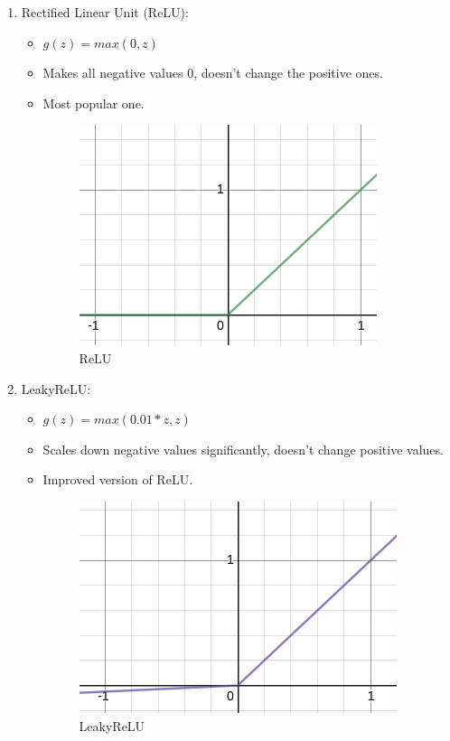 \documentclass{article}
\begin{document}
\begin{enumerate}
\begin{itemize}
		\end{itemize}\pagebreak
		\item Rectified Linear Unit (ReLU):\begin{itemize}
			\item \Large$g(z) = max(0,z)$\large
			\item Makes all negative values 0, doesn't change the positive ones.
			\item Most popular one.
			\begin{figure}[h]
				\centering
				\includegraphics[scale=0.5]{im/relu.png}
				\caption{ReLU}
			\end{figure}
		\end{itemize}
		\item LeakyReLU:\begin{itemize}
			\item \Large$g(z) = max(0.01*z,z)$\large
			\item Scales down negative values significantly, doesn't change positive values.
			\item Improved version of ReLU.
			\begin{figure}[h]
				\centering
				\includegraphics[scale=0.5]{im/leakyrelu.png}
				\caption{LeakyReLU}
			\end{figure}
		\end{itemize}
	\end{enumerate}
\end{document}
